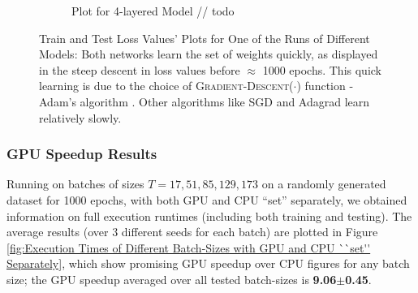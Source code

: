 \documentclass[12pt]{article}
\begin{document}
\begin{figure}[!htbp]
\begin{subfigure}{.49\textwidth}
            \caption{Plot for 4-layered Model // todo}
            \label{fig:Plot for 4-layered Model}
        \end{subfigure}
        \caption[Train and Test Loss Values' Plots for One of the Runs of Different Models]{Train and Test Loss Values' Plots for One of the Runs of Different Models: Both networks learn the set of weights quickly, as displayed in the steep descent in loss values before $\approx$ 1000 epochs. This quick learning is due to the choice of \textsc{Gradient-Descent}($\cdot$) function - Adam's algorithm \cite{Adam}. Other algorithms like SGD \cite{SGD} and Adagrad \cite{Adagrad} learn relatively slowly.}
        \label{fig:Train & Test Loss Values' Plots of Different Models}
    \end{figure}

    \subsubsection{GPU Speedup Results} \label{sec:IdProbRes - GPU}
    Running on batches of sizes $T = 17, 51, 85, 129, 173$ on a randomly generated dataset for 1000 epochs, with both GPU and CPU ``set'' separately, we obtained information on full execution runtimes (including both training and testing). The average results (over 3 different seeds for each batch) are plotted in Figure \ref{fig:Execution Times of Different Batch-Sizes with GPU and CPU ``set'' Separately}, which show promising GPU speedup over CPU figures for any batch size; the GPU speedup averaged over all tested batch-sizes is \textbf{9.06$\pm$0.45}.
\end{document}
